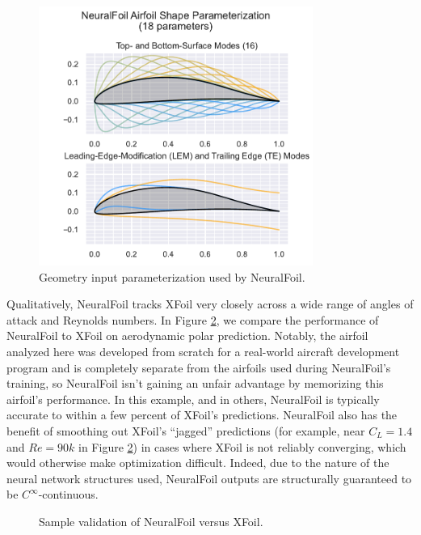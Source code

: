 \documentclass[12pt,vi,oneside,table]{report}
\begin{document}
    \begin{figure}[H]
        \centering
        \includegraphics[width=0.8\textwidth]{../figures/neuralfoil/kulfan_parameterization_illustration.pdf}
        \caption{Geometry input parameterization used by NeuralFoil.}
        \label{fig:neuralfoil_parameterization}
    \end{figure}

    Qualitatively, NeuralFoil tracks XFoil very closely across a wide range of angles of attack and Reynolds numbers. In Figure \ref{fig:clcd_polar}, we compare the performance of NeuralFoil to XFoil on aerodynamic polar prediction. Notably, the airfoil analyzed here was developed from scratch for a real-world aircraft development program and is completely separate from the airfoils used during NeuralFoil's training, so NeuralFoil isn't gaining an unfair advantage by memorizing this airfoil's performance. In this example, and in others, NeuralFoil is typically accurate to within a few percent of XFoil's predictions. NeuralFoil also has the benefit of smoothing out XFoil's ``jagged'' predictions (for example, near $C_L=1.4$ and $Re=90k$ in Figure \ref{fig:clcd_polar}) in cases where XFoil is not reliably converging, which would otherwise make optimization difficult. Indeed, due to the nature of the neural network structures used, NeuralFoil outputs are structurally guaranteed to be $C^\infty$-continuous.

    \begin{figure}[h]
        \centering
        
        \caption{Sample validation of NeuralFoil versus XFoil.}
        \label{fig:clcd_polar}
    \end{figure}
\end{document}
